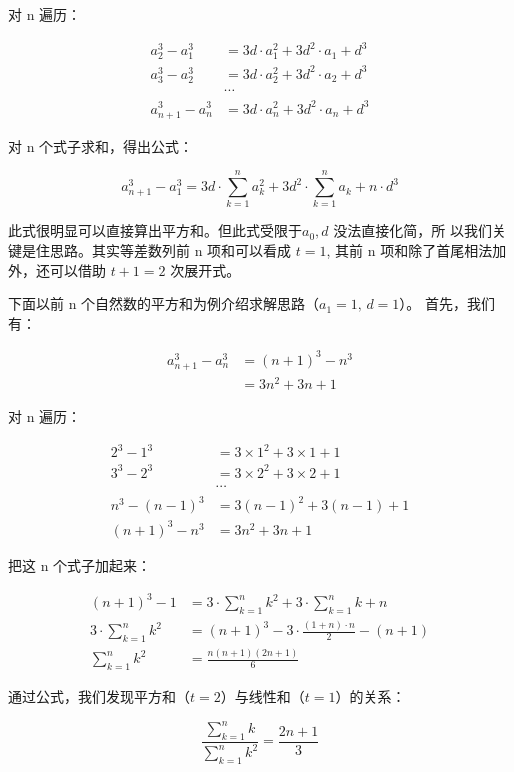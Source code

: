 对 n 遍历：

\[
  \begin{aligned}
    a_2^3 - a_1^3 &= 3d \cdot a_1^2 + 3d^2 \cdot a_1 + d^3 \\
    a_3^3 - a_2^3 &= 3d \cdot a_2^2 + 3d^2 \cdot a_2 + d^3 \\
    & \cdots \\
    a_{n+1}^3 - a_n^3 &= 3d \cdot a_n^2 + 3d^2 \cdot a_n + d^3
  \end{aligned}
\]

对 n 个式子求和，得出公式：

\[
  a_{n+1}^3 - a_1^3 = 3d \cdot \sum_{k = 1}^n a_k^2 + 3d^2 \cdot
  \sum_{k = 1}^n a_k + n \cdot d^3
\]

此式很明显可以直接算出平方和。但此式受限于$a_0, d$ 没法直接化简，所
以我们关键是住思路。其实等差数列前 n 项和可以看成 $t = 1$, 其前 n
项和除了首尾相法加外，还可以借助 $t + 1 = 2$ 次展开式。

下面以前 n 个自然数的平方和为例介绍求解思路（$a_1 = 1,\, d = 1$）。
首先，我们有：

\[
  \begin{aligned}
    a_{n+1}^3 - a_n^3 &= (n + 1)^3 - n^3 \\
    &= 3n^2 + 3n + 1
  \end{aligned}
\]

对 n 遍历：

\[
  \begin{aligned}
    2^3 - 1^3 &= 3 \times 1^2 + 3 \times 1 + 1 \\
    3^3 - 2^3 &= 3 \times 2^2 + 3 \times 2 + 1 \\
    & \cdots \\
    n^3 - (n - 1)^3 &= 3(n - 1)^2 + 3(n - 1) + 1 \\
    (n + 1)^3 - n^3 &= 3n^2 + 3n + 1
  \end{aligned}
\]

把这 n 个式子加起来：

\[
  \begin{aligned}
    (n + 1)^3 - 1 &= 3 \cdot \sum_{k = 1}^nk^2 + 3 \cdot \sum_{k =
      1}^nk + n \\
    3 \cdot \sum_{k = 1}^nk^2 &= (n + 1)^3 - 3 \cdot \frac{(1 + n)
      \cdot n}{2} - (n + 1) \\
    \sum_{k = 1}^nk^2 &= \frac{n(n + 1)(2n + 1)}{6}
  \end{aligned}
\]

通过公式，我们发现平方和（$t = 2$）与线性和（$t = 1$）的关系：

\[
  \frac{\sum_{k = 1}^n k}{\sum_{k = 1}^n k^2} = \frac{2n + 1}{3}
\]

